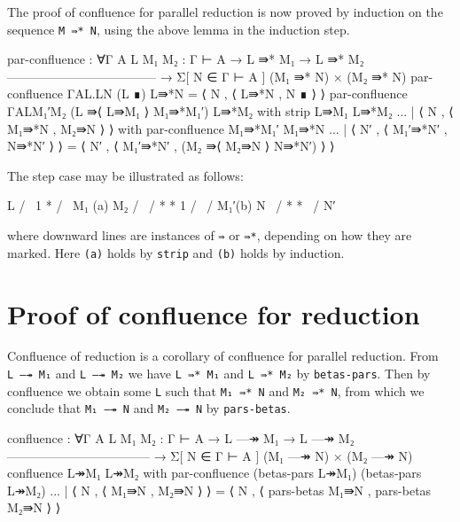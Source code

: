The proof of confluence for parallel reduction is now proved by
induction on the sequence \texttt{M\ ⇛*\ N}, using the above lemma in
the induction step.

\begin{fence}
\begin{code}
par-confluence : ∀{Γ A} {L M₁ M₂ : Γ ⊢ A}
  → L ⇛* M₁
  → L ⇛* M₂
    ------------------------------------
  → Σ[ N ∈ Γ ⊢ A ] (M₁ ⇛* N) × (M₂ ⇛* N)
par-confluence {Γ}{A}{L}{.L}{N} (L ∎) L⇛*N = ⟨ N , ⟨ L⇛*N , N ∎ ⟩ ⟩
par-confluence {Γ}{A}{L}{M₁′}{M₂} (L ⇛⟨ L⇛M₁ ⟩ M₁⇛*M₁′) L⇛*M₂
    with strip L⇛M₁ L⇛*M₂
... | ⟨ N , ⟨ M₁⇛*N , M₂⇛N ⟩ ⟩
      with par-confluence M₁⇛*M₁′ M₁⇛*N
...   | ⟨ N′ , ⟨ M₁′⇛*N′ , N⇛*N′ ⟩ ⟩ =
        ⟨ N′ , ⟨ M₁′⇛*N′ , (M₂ ⇛⟨ M₂⇛N ⟩ N⇛*N′) ⟩ ⟩
\end{code}
\end{fence}

The step case may be illustrated as follows:

\begin{myDisplay}
        L
       / \
      1   *
     /     \
    M₁ (a)  M₂
   / \     /
  *   *   1
 /     \ /
M₁′(b)  N
 \     /
  *   *
   \ /
    N′
\end{myDisplay}

where downward lines are instances of \texttt{⇛} or \texttt{⇛*},
depending on how they are marked. Here \texttt{(a)} holds by
\texttt{strip} and \texttt{(b)} holds by induction.

\hypertarget{proof-of-confluence-for-reduction}{%
\section{Proof of confluence for
reduction}\label{proof-of-confluence-for-reduction}}

Confluence of reduction is a corollary of confluence for parallel
reduction. From \texttt{L\ —↠\ M₁} and \texttt{L\ —↠\ M₂} we have
\texttt{L\ ⇛*\ M₁} and \texttt{L\ ⇛*\ M₂} by \texttt{betas-pars}. Then
by confluence we obtain some \texttt{L} such that \texttt{M₁\ ⇛*\ N} and
\texttt{M₂\ ⇛*\ N}, from which we conclude that \texttt{M₁\ —↠\ N} and
\texttt{M₂\ —↠\ N} by \texttt{pars-betas}.

\begin{fence}
\begin{code}
confluence : ∀{Γ A} {L M₁ M₂ : Γ ⊢ A}
  → L —↠ M₁
  → L —↠ M₂
    -----------------------------------
  → Σ[ N ∈ Γ ⊢ A ] (M₁ —↠ N) × (M₂ —↠ N)
confluence L↠M₁ L↠M₂
    with par-confluence (betas-pars L↠M₁) (betas-pars L↠M₂)
... | ⟨ N , ⟨ M₁⇛N , M₂⇛N ⟩ ⟩ =
      ⟨ N , ⟨ pars-betas M₁⇛N , pars-betas M₂⇛N ⟩ ⟩
\end{code}
\end{fence}

